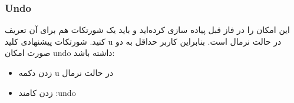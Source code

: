 \subsubsection*{{\titr Undo}}


این امکان را در فاز قبل پیاده سازی کرده‌اید و باید یک شورتکات هم برای آن تعریف کنید. شورتکات پیشنهادی کلید u در حالت نرمال است. بنابراین کاربر حداقل به دو صورت امکان undo داشته باشد:
\begin{itemize}
    \item زدن دکمه u در حالت نرمال
    \item زدن کامند :undo
\end{itemize}

\newpage